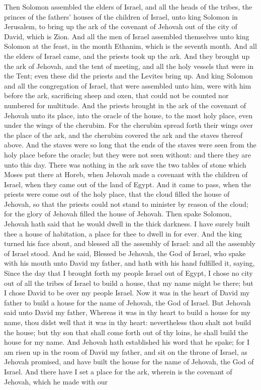 Then Solomon assembled the elders of Israel, and all the heads of the tribes, the princes of the fathers’ houses of the children of Israel, unto king Solomon in Jerusalem, to bring up the ark of the covenant of Jehovah out of the city of David, which is Zion. And all the men of Israel assembled themselves unto king Solomon at the feast, in the month Ethanim, which is the seventh month. And all the elders of Israel came, and the priests took up the ark. And they brought up the ark of Jehovah, and the tent of meeting, and all the holy vessels that were in the Tent; even these did the priests and the Levites bring up. And king Solomon and all the congregation of Israel, that were assembled unto him, were with him before the ark, sacrificing sheep and oxen, that could not be counted nor numbered for multitude. And the priests brought in the ark of the covenant of Jehovah unto its place, into the oracle of the house, to the most holy place, even under the wings of the cherubim. For the cherubim spread forth their wings over the place of the ark, and the cherubim covered the ark and the staves thereof above. And the staves were so long that the ends of the staves were seen from the holy place before the oracle; but they were not seen without: and there they are unto this day. There was nothing in the ark save the two tables of stone which Moses put there at Horeb, when Jehovah made a covenant with the children of Israel, when they came out of the land of Egypt. And it came to pass, when the priests were come out of the holy place, that the cloud filled the house of Jehovah, so that the priests could not stand to minister by reason of the cloud; for the glory of Jehovah filled the house of Jehovah.  Then spake Solomon, Jehovah hath said that he would dwell in the thick darkness. I have surely built thee a house of habitation, a place for thee to dwell in for ever. And the king turned his face about, and blessed all the assembly of Israel: and all the assembly of Israel stood. And he said, Blessed be Jehovah, the God of Israel, who spake with his mouth unto David my father, and hath with his hand fulfilled it, saying, Since the day that I brought forth my people Israel out of Egypt, I chose no city out of all the tribes of Israel to build a house, that my name might be there; but I chose David to be over my people Israel. Now it was in the heart of David my father to build a house for the name of Jehovah, the God of Israel. But Jehovah said unto David my father, Whereas it was in thy heart to build a house for my name, thou didst well that it was in thy heart: nevertheless thou shalt not build the house; but thy son that shall come forth out of thy loins, he shall build the house for my name. And Jehovah hath established his word that he spake; for I am risen up in the room of David my father, and sit on the throne of Israel, as Jehovah promised, and have built the house for the name of Jehovah, the God of Israel. And there have I set a place for the ark, wherein is the covenant of Jehovah, which he made with our 